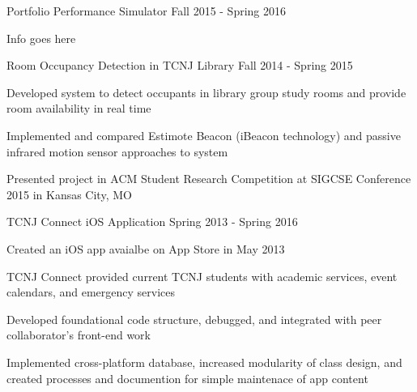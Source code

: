 

\begin{cventries}

  \bproject
    {Portfolio Performance Simulator} %
    {Fall 2015 - Spring 2016} %
    {
      \begin{cvitems} %
        \item {Info goes here}
      \end{cvitems}
    }

  \bproject
    {Room Occupancy Detection in TCNJ Library} %
    {Fall 2014 - Spring 2015} %
    {
      \begin{cvitems} %
        \item {Developed system to detect occupants in library group study rooms and provide room availability in real time}
        \item {Implemented and compared Estimote Beacon (iBeacon technology) and passive infrared motion sensor approaches to system}
        \item {Presented project in ACM Student Research Competition at SIGCSE Conference 2015 in Kansas City, MO}
      \end{cvitems}
    }

  \bproject
    {TCNJ Connect iOS Application} %
    {Spring 2013 - Spring 2016} %
    {
      \begin{cvitems} %
        \item {Created an iOS app avaialbe on App Store in May 2013}
        \item {TCNJ Connect provided current TCNJ students with academic services, event calendars, and emergency services}
        \item {Developed foundational code structure, debugged, and integrated with peer collaborator's front-end work}
        \item {Implemented cross-platform database, increased modularity of class design, and created processes and documention for simple maintenace of app content}
      \end{cvitems}
    }


\end{cventries}
